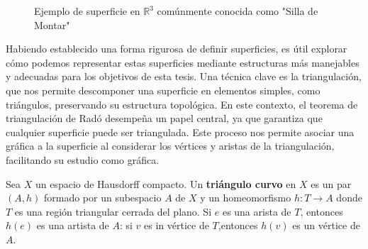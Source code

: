 \begin{example}
\begin{figure}[H]
	\centering
    \label{fig:silla}
    \caption{Ejemplo de superficie en $\mathbb{R}^3$ comúnmente conocida como "Silla de Montar"}
\end{figure}


\end{example}
Habiendo establecido una forma rigurosa de definir superficies, es útil explorar cómo podemos representar estas superficies mediante estructuras más manejables y adecuadas para los objetivos de esta tesis. Una técnica clave es la triangulación, que nos permite descomponer una superficie en elementos simples, como triángulos, preservando su estructura topológica. En este contexto, el teorema de triangulación de Radó desempeña un papel central, ya que garantiza que cualquier superficie puede ser triangulada. Este proceso nos permite asociar una gráfica a la superficie al considerar los vértices y aristas de la triangulación, facilitando su estudio como gráfica.

\begin{definition}
    Sea $X$ un espacio de Hausdorff compacto. Un \textbf{triángulo curvo} en $X$ es un par $(A,h)$ formado por un subespacio $A$ de $X$ y un homeomorfismo $h: T \rightarrow A$ donde $T$ es una región triangular cerrada del plano. 
    Si $e$ es una arista de $T$, entonces $h(e)$ es una artista de $A$: si $v$ es in vértice de $T$,entonces $h(v)$ es un vértice de $A$.
    
\end{definition}


